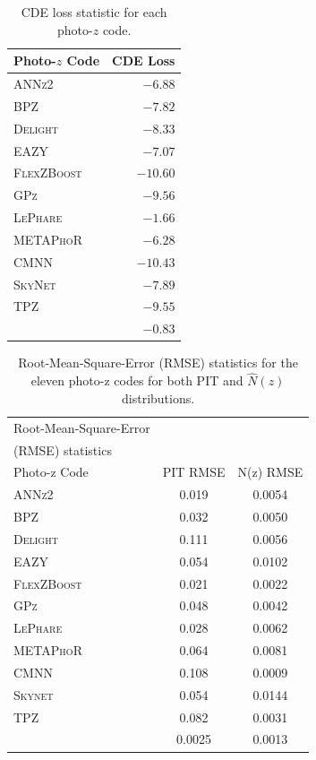 \begin{table}  %
\centering
\caption{CDE loss statistic for each photo-$z$ code.} \label{tab:cdeloss}
\begin{tabular}{lr}
\hline
\bf Photo-$z$ Code & \bf CDE Loss \\
\hline
\textsc{ANNz2} 		& $-6.88$ \\
\textsc{BPZ} 		& $-7.82$ \\
\textsc{Delight}    & $-8.33$\\
\textsc{EAZY}       & $-7.07$ \\
\textsc{FlexZBoost} & $-10.60$\\
\textsc{GPz} 		& $-9.56$ \\
\textsc{LePhare} 	& $-1.66$ \\
\textsc{METAPhoR} 	& $-6.28$ \\
\textsc{CMNN}         & $-10.43$ \\
\textsc{SkyNet} 	& $-7.89$ \\
\textsc{TPZ} 		& $-9.55$ \\
\hline
\trainz		& $-0.83$ \\
\end{tabular}
\end{table}

\begin{table}
\setlength{\tabcolsep}{2pt}
\begin{center}
\caption{Root-Mean-Square-Error (RMSE) statistics for the eleven photo-z codes for both PIT and $\hat{N}(z)$ distributions.}\label{tab:rmse}
\begin{tabular}{lcc}
\hline
\hline
Root-Mean-Square-Error \\
(RMSE) statistics \\
\hline
Photo-z Code & PIT RMSE & N(z) RMSE\\
\hline
\textsc{ANNz2}      & 0.019 & 0.0054\\
\textsc{BPZ}        & 0.032 & 0.0050\\
\textsc{Delight}    & 0.111 & 0.0056\\
\textsc{EAZY}       & 0.054 & 0.0102\\
\textsc{FlexZBoost} & 0.021 & 0.0022\\
\textsc{GPz}        & 0.048 & 0.0042\\
\textsc{LePhare}    & 0.028 & 0.0062\\
\textsc{METAPhoR}   & 0.064 & 0.0081\\
\textsc{CMNN}         & 0.108 & 0.0009\\
\textsc{Skynet}     & 0.054 & 0.0144\\
\textsc{TPZ}        & 0.082 & 0.0031\\
\hline
\trainz		& 0.0025 & 0.0013\\
\end{tabular}
\end{center}
\end{table}

